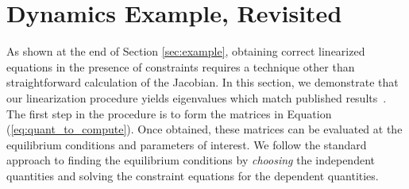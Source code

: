 %
%
%

%

\section{Dynamics Example, Revisited}
\label{sec:example_revisited}
As shown at the end of Section \ref{sec:example}, obtaining correct linearized
equations in the presence of constraints requires a technique other than
straightforward calculation of the Jacobian. In this section, we demonstrate
that our linearization procedure yields eigenvalues which match published
results~\cite{Schwab2003,Kane1985,Neimark1972}. The first step in the procedure
is to form the matrices in Equation (\ref{eq:quant_to_compute}). Once obtained,
these matrices can be evaluated at the equilibrium conditions and parameters of
interest. We follow the standard approach to finding the equilibrium conditions
by \textit{choosing} the independent quantities and solving the constraint
equations for the dependent quantities.

